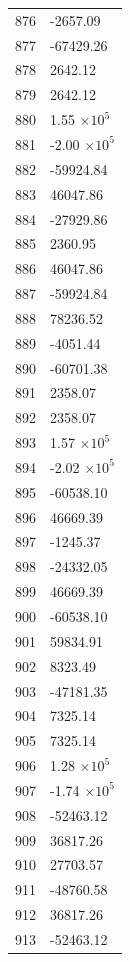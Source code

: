 \documentclass[a4paper,11pt]{article}
\begin{document}
\begin{center}
\begin{longtable}{|R{1.5cm}|R{2.5cm}|}
  876 &     -2657.09 \\
  877 &    -67429.26 \\
  878 &      2642.12 \\
  879 &      2642.12 \\
  880 &         1.55 $\times 10^{           5}$ \\
  881 &        -2.00 $\times 10^{           5}$ \\
  882 &    -59924.84 \\
  883 &     46047.86 \\
  884 &    -27929.86 \\
  885 &      2360.95 \\
  886 &     46047.86 \\
  887 &    -59924.84 \\
  888 &     78236.52 \\
  889 &     -4051.44 \\
  890 &    -60701.38 \\
  891 &      2358.07 \\
  892 &      2358.07 \\
 {\color{OliveGreen} 893} & {\color{OliveGreen}        1.57 $\times 10^{           5}$} \\
  894 &        -2.02 $\times 10^{           5}$ \\
  895 &    -60538.10 \\
  896 &     46669.39 \\
  897 &     -1245.37 \\
  898 &    -24332.05 \\
  899 &     46669.39 \\
  900 &    -60538.10 \\
  901 &     59834.91 \\
  902 &      8323.49 \\
  903 &    -47181.35 \\
  904 &      7325.14 \\
  905 &      7325.14 \\
  906 &         1.28 $\times 10^{           5}$ \\
  907 &        -1.74 $\times 10^{           5}$ \\
  908 &    -52463.12 \\
  909 &     36817.26 \\
  910 &     27703.57 \\
  911 &    -48760.58 \\
  912 &     36817.26 \\
  913 &    -52463.12 \\

\end{longtable}
\end{center}
\end{document}
